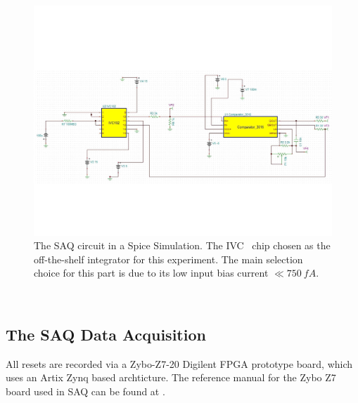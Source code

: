 \begin{figure}[]
\centering
\includegraphics[width=\textwidth]{images/SAQ_spice_circuit.pdf}
\caption{The SAQ circuit in a Spice Simulation. The IVC~\citep{ivc_datasheet} chip chosen as the off-the-shelf integrator for this experiment. The main selection choice for this part is due to its low input bias current $\ll 750~\unit{fA}$.}
\end{figure}~\label{fig:saq_circuit_spice}


\subsection{The SAQ Data Acquisition}

All resets are recorded via a Zybo-Z7-20 Digilent FPGA prototype board, which uses an Artix Zynq based archticture.
The reference manual for the Zybo Z7 board used in SAQ can be found at \citep{zybo_zy_reference}.

